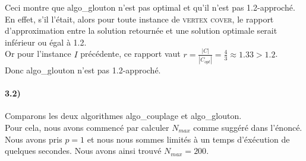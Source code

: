 \documentclass[12pt]{article}
\begin{document}
        Ceci montre que algo\_glouton n'est pas optimal et qu'il n'est pas 1.2-approché. \\
        En effet, s'il l'était, alors pour toute instance de \textsc{vertex cover}, le rapport d'approximation entre la solution retournée et une solution optimale serait inférieur ou égal à 1.2. \\
        Or pour l'instance $I$ précédente, ce rapport vaut $r = \frac{|C|}{|C_{opt}|} = \frac{4}{3} \approx 1.33 > 1.2$. \\
        Donc algo\_glouton n'est pas 1.2-approché.

    \paragraph{3.2)}
        Comparons les deux algorithmes algo\_couplage et algo\_glouton. \\
        Pour cela, nous avons commencé par calculer $N_{max}$ comme suggéré dans l'énoncé. Nous avons pris $p = 1$ et nous nous sommes limités à un temps d'éxécution de quelques secondes. Nous avons ainsi trouvé $N_{max} = 200$.
\end{document}
